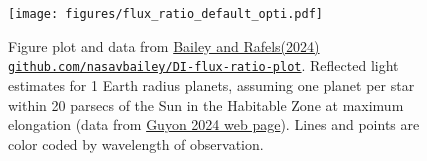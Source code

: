 \documentclass[letterpaper]{ar-1col}
\newcommand{\ld}{$\lambda/D$}
\begin{document}
\begin{figure}[ht]
  \centering
  \texttt{[image: figures/flux\_ratio\_default\_opti.pdf]}
  \caption{Figure plot and data from \citet{Bailey24} \href{https://github.com/nasavbailey/DI-flux-ratio-plot}{Bailey and Rafels(2024)  {\tt github.com/nasavbailey/DI-flux-ratio-plot}}. Reflected light estimates for 1 Earth radius planets, assuming one planet per star within 20 parsecs of the Sun in the Habitable Zone at maximum elongation (data from \href{https://subarutelescope.org/staff/guyon/04research.web/14hzplanetsELTs.web/catalog.web/content.html}{Guyon 2024 web page}).  Lines and points are color coded by wavelength of observation. 
}
\end{figure}
\end{document}
